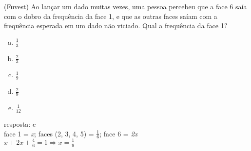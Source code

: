\begin{ex}
(Fuvest) Ao lançar um dado muitas vezes, uma pessoa percebeu que a face 6 saía com o dobro da frequência da face 1, e que as outras faces saíam com a frequência esperada em um dado não viciado. Qual a frequência da face 1?
   \begin{enumerate}[(a)]
   \item $\frac{1}{3}$
   \item $\frac{2}{3}$
   \item $\frac{1}{9}$
   \item $\frac{2}{9}$
   \item $\frac{1}{12}$
   \end{enumerate}
     \begin{sol}
      resposta: c \\
      face 1 = \textit{x};\hspace{0,3cm} faces (2, 3, 4, 5) = $\frac{1}{6}$;\hspace{0,3cm}  face 6 = \textit{2x} \\
      $x+2x+\frac{4}{6}=1 \Longrightarrow x = \frac{1}{9}$
      
     \end{sol}
\end{ex}